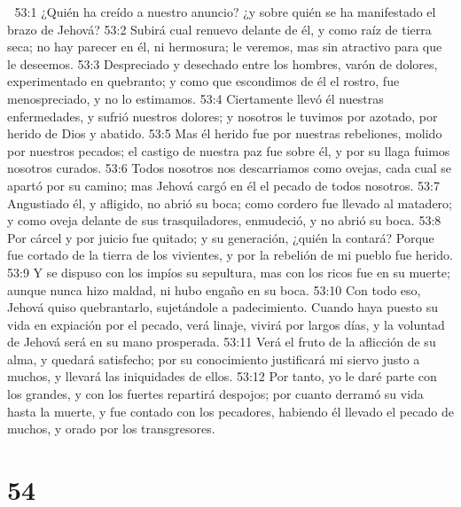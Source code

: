 
53:1 ¿Quién ha creído a nuestro anuncio? ¿y sobre quién se ha manifestado el brazo de Jehová?  
53:2 Subirá cual renuevo delante de él, y como raíz de tierra seca; no hay parecer en él, ni hermosura; le veremos, mas sin atractivo para que le deseemos.  
53:3 Despreciado y desechado entre los hombres, varón de dolores, experimentado en quebranto; y como que escondimos de él el rostro, fue menospreciado, y no lo estimamos.  
53:4 Ciertamente llevó él nuestras enfermedades, y sufrió nuestros dolores; y nosotros le tuvimos por azotado, por herido de Dios y abatido.  
53:5 Mas él herido fue por nuestras rebeliones, molido por nuestros pecados; el castigo de nuestra paz fue sobre él, y por su llaga fuimos nosotros curados. 
53:6 Todos nosotros nos descarriamos como ovejas, cada cual se apartó por su camino; mas Jehová cargó en él el pecado de todos nosotros.  
53:7 Angustiado él, y afligido, no abrió su boca; como cordero fue llevado al matadero; y como oveja delante de sus trasquiladores, enmudeció, y no abrió su boca.  
53:8 Por cárcel y por juicio fue quitado; y su generación, ¿quién la contará? Porque fue cortado de la tierra de los vivientes, y por la rebelión de mi pueblo fue herido.  
53:9 Y se dispuso con los impíos su sepultura, mas con los ricos fue en su muerte; aunque nunca hizo maldad, ni hubo engaño en su boca. 
53:10 Con todo eso, Jehová quiso quebrantarlo, sujetándole a padecimiento. Cuando haya puesto su vida en expiación por el pecado, verá linaje, vivirá por largos días, y la voluntad de Jehová será en su mano prosperada.  
53:11 Verá el fruto de la aflicción de su alma, y quedará satisfecho; por su conocimiento justificará mi siervo justo a muchos, y llevará las iniquidades de ellos.  
53:12 Por tanto, yo le daré parte con los grandes, y con los fuertes repartirá despojos; por cuanto derramó su vida hasta la muerte, y fue contado con los pecadores, habiendo él llevado el pecado de muchos, y orado por los transgresores.  

\chapter{54}

